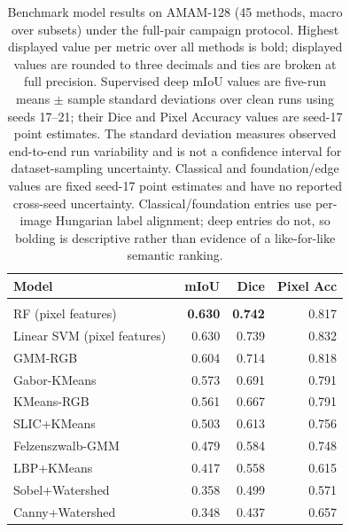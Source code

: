 \documentclass{article}
\newcommand{\datasetname}{AMAM-128}
\begin{document}
\begin{table}[H]
    \centering
    \footnotesize
    \setlength{\tabcolsep}{3pt}
    \renewcommand{\arraystretch}{0.95}
    \caption{Benchmark model results on \datasetname{} (45 methods, macro over
subsets) under the full-pair campaign protocol. Highest displayed value per metric
over all methods is bold; displayed values are rounded to three decimals and
ties are broken at full precision. Supervised deep mIoU values are five-run
means $\pm$ sample standard deviations over clean runs using seeds 17--21;
their Dice and Pixel Accuracy values are seed-17 point estimates. The standard
deviation measures observed end-to-end run variability and is not a confidence
interval for dataset-sampling uncertainty. Classical and foundation/edge
values are fixed seed-17 point estimates and have no reported cross-seed
uncertainty. Classical/foundation entries use per-image Hungarian label
alignment; deep entries do not, so bolding is descriptive rather than evidence
of a like-for-like semantic ranking.
}
    \label{tab:benchmark-model-results}
    \begin{tabularx}{\linewidth}{>{\raggedright\arraybackslash}Xrrr}
        \toprule
        Model & mIoU & Dice & Pixel Acc \\
        \midrule
        \multicolumn{4}{l}{\textbf{Classical (10)}} \\
        RF (pixel features)~\citep{breiman2001random} & \textbf{0.630} & \textbf{0.742} & 0.817 \\
        Linear SVM (pixel features)~\citep{cortes1995support} & 0.630 & 0.739 & 0.832 \\
        GMM-RGB~\citep{bishop2006pattern} & 0.604 & 0.714 & 0.818 \\
        Gabor-KMeans~\citep{daugman1985uncertainty,lloyd1982least} & 0.573 & 0.691 & 0.791 \\
        KMeans-RGB~\citep{lloyd1982least} & 0.561 & 0.667 & 0.791 \\
        SLIC+KMeans~\citep{achanta2012slic,lloyd1982least} & 0.503 & 0.613 & 0.756 \\
        Felzenszwalb-GMM~\citep{felzenszwalb2004efficient,bishop2006pattern} & 0.479 & 0.584 & 0.748 \\
        LBP+KMeans~\citep{ojala2002multiresolution,lloyd1982least} & 0.417 & 0.558 & 0.615 \\
        Sobel+Watershed~\citep{canny1986computational,beucher1979use} & 0.358 & 0.499 & 0.571 \\
        Canny+Watershed~\citep{canny1986computational,beucher1979use} & 0.348 & 0.437 & 0.657 \\

\end{tabularx}
\end{table}
\end{document}
